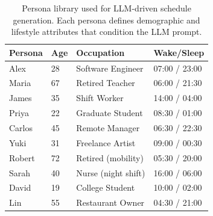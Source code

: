 \begin{table}[t]
  \centering
  \caption{Persona library used for LLM-driven schedule generation.
  Each persona defines demographic and lifestyle attributes that
  condition the LLM prompt.}
  \label{tab:personas}
  \small
  \begin{tabular}{l l l l}
    \toprule
    {Persona} & {Age} & {Occupation} & {Wake/Sleep} \\
    \midrule
    Alex   & 28 & Software Engineer   & 07:00 / 23:00 \\
    Maria  & 67 & Retired Teacher     & 06:00 / 21:30 \\
    James  & 35 & Shift Worker        & 14:00 / 04:00 \\
    Priya  & 22 & Graduate Student    & 08:30 / 01:00 \\
    Carlos & 45 & Remote Manager      & 06:30 / 22:30 \\
    Yuki   & 31 & Freelance Artist    & 09:00 / 00:30 \\
    Robert & 72 & Retired (mobility)  & 05:30 / 20:00 \\
    Sarah  & 40 & Nurse (night shift) & 16:00 / 06:00 \\
    David  & 19 & College Student     & 10:00 / 02:00 \\
    Lin    & 55 & Restaurant Owner    & 04:30 / 21:00 \\
    \bottomrule
  \end{tabular}
\end{table}

